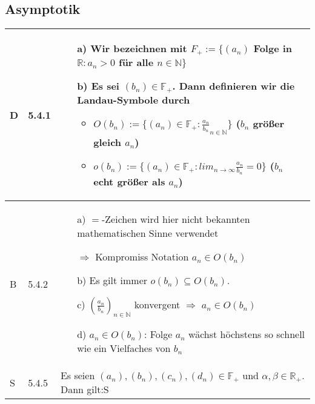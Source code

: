 \subsection{Asymptotik}

    \begin{longtable}{p{0.75cm} p{1cm} p{16cm}}
        \toprule
        
        D   & 5.4.1 &   \begin{itemize}[topsep=-0.5cm]
                            \item[a)] Wir bezeichnen mit $F_+ := \{(a_n)$ Folge in $\mathbb{R}: a_n > 0$ für alle $n \in \mathbb{N} \}$
                            \item[b)] Es sei $(b_n) \in \mathbb{F_+}$. Dann definieren wir die Landau-Symbole durch
                                \begin{itemize}[topsep=-0.5cm]
                                    \item $O(b_n) := \{(a_n) \in \mathbb{F_+} : \frac{a_n}{b_n}_{n \in \mathbb{N}}\}$ ($b_n$ größer gleich $a_n$)
                                    \item $o(b_n) := \{(a_n) \in \mathbb{F_+}: lim_{n \rightarrow \infty} \frac{a_n}{b_n} = 0\}$ ($b_n$ echt größer als $a_n$)
                                \end{itemize}
                        \end{itemize} \vspace{-0cm} \\
        \midrule
        B   & 5.4.2 &   \begin{itemize}[topsep=-0.5cm]
                            \item[a)] $=$-Zeichen wird hier nicht bekannten mathematischen Sinne verwendet
                            \item[] $\Rightarrow$ Kompromiss Notation $a_n \in O(b_n)$ 
                            \item[b)] Es gilt immer $o(b_n) \subseteq O(b_n)$. 
                            \item[c)] $(\frac{a_n}{b_n})_{n \in \mathbb{N}}$ konvergent $\Rightarrow$ $a_n \in O(b_n)$
                            \item[d)] $a_n \in O(b_n)$: Folge $a_n$ wächst höchstens so schnell wie ein Vielfaches von $b_n$  
                        \end{itemize} \vspace{-0cm} \\
        \midrule
        S   & 5.4.5 &   Es seien $(a_n), (b_n), (c_n), (d_n) \in \mathbb{F_+}$ und $\alpha, \beta \in \mathbb{R_+}$. Dann gilt:S

\end{longtable}

